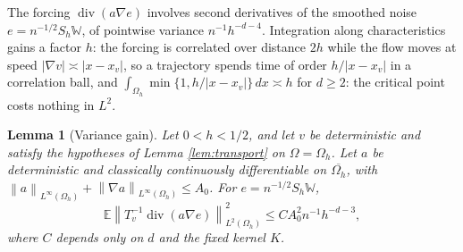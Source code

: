 \documentclass[11pt]{article}
\numberwithin{equation}{section}
\newtheorem{lemma}[theorem]{Lemma}
\newcommand{\E}{\mathbb E}
\newcommand{\norm}[1]{\left\|#1\right\|}
\newcommand{\diver}{\operatorname{div}}
\begin{document}
The forcing $\diver(a\nabla e)$ involves second derivatives of the
smoothed noise $e=n^{-1/2}S_h\mathbb W$, of pointwise variance
$n^{-1}h^{-d-4}$. Integration along characteristics gains a factor
$h$: the forcing is correlated over distance $2h$ while the flow moves
at speed $|\nabla v|\asymp|x-x_v|$, so a trajectory spends time of
order $h/|x-x_v|$ in a correlation ball, and
$\int_{\Omega_h}\min\{1,h/|x-x_v|\}\,dx\asymp h$ for $d\ge2$: the
critical point costs nothing in $L^2$.

\begin{lemma}[Variance gain]\label{lem:variance}
Let $0<h<1/2$, and let $v$ be deterministic and satisfy the
hypotheses of Lemma \ref{lem:transport} on $\Omega=\Omega_h$.
Let $a$ be deterministic and classically continuously differentiable
on $\overline{\Omega_h}$, with
$\norm a_{L^\infty(\Omega_h)}+\norm{\nabla a}_{L^\infty(\Omega_h)}\le A_0$.
For $e=n^{-1/2}S_h\mathbb W$,
\begin{equation}\label{eq:sharpvariance}
 \E\norm{T_v^{-1}\diver(a\nabla e)}_{L^2(\Omega_h)}^2
 \le C A_0^2 n^{-1}h^{-d-3},
\end{equation}
where $C$ depends only on $d$ and the fixed kernel $K$.
\end{lemma}
\end{document}
